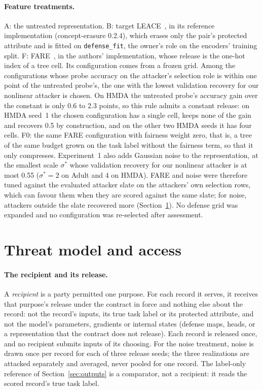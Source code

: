 \documentclass[10pt]{article}
\begin{document}
\paragraph{Feature treatments.} A: the untreated representation. B: target LEACE~\citep{belrose2023leace}, in its
reference implementation (concept-erasure 0.2.4), which erases only the pair's protected attribute and is fitted on
\texttt{defense\_fit}, the owner's role on the encoders' training split. F: FARE~\citep{jovanovic2023fare}, in the authors' implementation, whose release is the one-hot
index of a tree cell. Its configuration comes from a frozen grid. Among the configurations whose probe accuracy on the
attacker's selection role is within one point of the untreated probe's, the one with the lowest validation recovery for
our nonlinear attacker is chosen. On HMDA the untreated probe's accuracy gain over the constant is only 0.6 to 2.3 points, so this
rule admits a constant release: on HMDA seed~1 the chosen configuration has a single cell, keeps none of the gain and
recovers 0.5 by construction, and on the other two HMDA seeds it has four cells. F0: the same FARE configuration with
fairness weight zero, that is, a tree of the same budget grown on the task label without the fairness term, so that it
only compresses. Experiment~1 also adds Gaussian noise to the representation, at the smallest scale $\sigma^*$ whose
validation recovery for our nonlinear attacker is at most 0.55 ($\sigma^*=2$ on Adult and 4 on HMDA). FARE and noise
were therefore tuned against the evaluated attacker slate on the attackers' own selection rows, which can favour them
when they are scored against the same slate; for noise, attackers outside the slate recovered more
(Section~\ref{sec:threat}). No defense grid was expanded and no configuration was re-selected after assessment.

\section{Threat model and access}\label{sec:threat}

\paragraph{The recipient and its release.} A \emph{recipient} is a party permitted one purpose. For each record it
serves, it receives that purpose's release under the contract in force and nothing else about the record: not the
record's inputs, its true task label or its protected attribute, and not the model's parameters, gradients or internal
states (defense maps, heads, or a representation that the contract does not release). Each record is released once, and
no recipient submits inputs of its choosing. For the noise treatment, noise is drawn once per record for each of three
release seeds; the three realizations are attacked separately and averaged, never pooled for one record. The label-only
reference of Section~\ref{sec:outputs} is a comparator, not a recipient: it reads the scored record's true task label.
\end{document}
